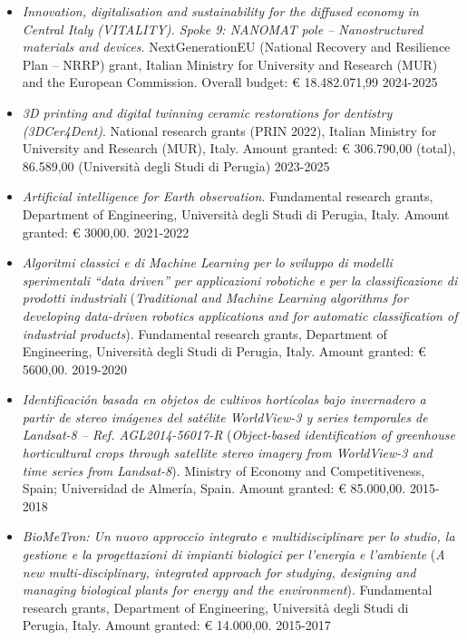 \documentclass[11pt]{article}
\begin{document}
\begin{itemize}

	\item \emph{Innovation, digitalisation and sustainability for the diffused economy in Central Italy (VITALITY). Spoke 9: NANOMAT pole -- Nanostructured materials and devices}. NextGenerationEU (National Recovery and Resilience Plan -- NRRP) grant, Italian Ministry for University and Research (MUR) and the European Commission. Overall budget: € 18.482.071,99 \hfill 2024-2025

	\item \emph{3D printing and digital twinning ceramic restorations for dentistry (3DCer4Dent)}. National research grants (PRIN 2022), Italian Ministry for University and Research (MUR), Italy. Amount granted: € 306.790,00 (total), 86.589,00 (Università degli Studi di Perugia) \hfill 2023-2025

	\item \emph{Artificial intelligence for Earth observation}. Fundamental research grants, Department of Engineering, Università degli Studi di Perugia, Italy. Amount granted: € 3000,00. \hfill 2021-2022
	
	\item \emph{Algoritmi  classici e  di Machine  Learning per lo sviluppo di modelli sperimentali ``data driven'' per applicazioni robotiche e per la classificazione di prodotti industriali} (\emph{Traditional and Machine Learning algorithms for developing data-driven robotics applications and for automatic classification of industrial products}). Fundamental research grants, Department of Engineering, Università degli Studi di Perugia, Italy. Amount granted: € 5600,00. \hfill 2019-2020
	
	\item \emph{Identificación basada en objetos de cultivos hortícolas bajo invernadero a partir de stereo imágenes del satélite WorldView-3 y series temporales de Landsat-8 -- Ref. AGL2014-56017-R} (\emph{Object-based identification of greenhouse horticultural crops through satellite stereo imagery from WorldView-3 and time series from Landsat-8}). Ministry of Economy and Competitiveness, Spain; Universidad de Almería, Spain. Amount granted: € 85.000,00. \hfill 2015-2018
	
	\item \emph{BioMeTron: Un nuovo approccio integrato e multidisciplinare per lo studio, la gestione e la progettazioni di impianti biologici per l'energia e l'ambiente} (\emph{A new multi-disciplinary, integrated approach for studying, designing and managing biological plants for energy and the environment}). Fundamental research grants, Department of Engineering, Università degli Studi di Perugia, Italy. Amount granted: € 14.000,00. \hfill 2015-2017


\end{itemize}
\end{document}
